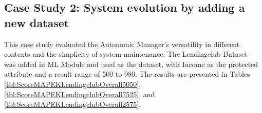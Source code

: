 \documentclass[sigconf]{acmart}
\begin{document}
\begin{table}[H]
\begin{center}
  \caption{Best configurations chosen by Autonomic Manager \\ 25\% Evaluation/75\% Fairness}
\label{tbl:ScoreMAPEKOverall2575}
\end{center}
\end{table}

\subsection{Case Study 2: System evolution by adding a new dataset}

This case study evaluated the Autonomic Manager's versatility in different contexts and the simplicity of system maintenance. The Lendingclub Dataset~\citep{lendingclub_2022} was added in ML Module and used as the dataset, with Income as the protected attribute and a result range of 500 to 980. The results are presented in Tables \ref{tbl:ScoreMAPEKLendingclubOverall5050}, \ref{tbl:ScoreMAPEKLendingclubOverall7525}, and \ref{tbl:ScoreMAPEKLendingclubOverall2575}.
\end{document}
